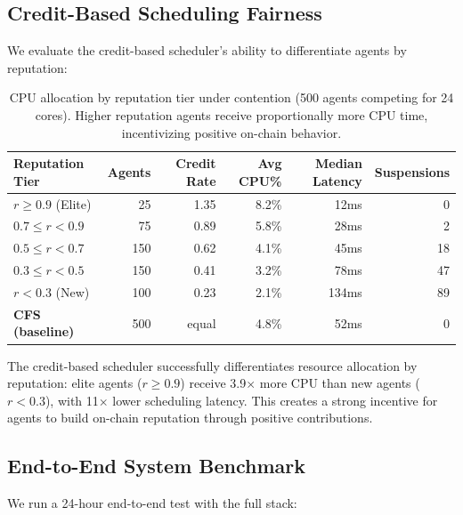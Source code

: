\documentclass{article}
\begin{document}
\subsection{Credit-Based Scheduling Fairness}

We evaluate the credit-based scheduler's ability to differentiate agents by reputation:

\begin{table}[t]
\caption{CPU allocation by reputation tier under contention (500 agents competing for 24 cores). Higher reputation agents receive proportionally more CPU time, incentivizing positive on-chain behavior.}
\label{tab:fairness}
\centering
\small
\begin{tabular}{lrrrrr}
\toprule
\textbf{Reputation Tier} & \textbf{Agents} & \textbf{Credit Rate} & \textbf{Avg CPU\%} & \textbf{Median Latency} & \textbf{Suspensions} \\
\midrule
$r \geq 0.9$ (Elite) & 25 & 1.35 & 8.2\% & 12ms & 0 \\
$0.7 \leq r < 0.9$ & 75 & 0.89 & 5.8\% & 28ms & 2 \\
$0.5 \leq r < 0.7$ & 150 & 0.62 & 4.1\% & 45ms & 18 \\
$0.3 \leq r < 0.5$ & 150 & 0.41 & 3.2\% & 78ms & 47 \\
$r < 0.3$ (New) & 100 & 0.23 & 2.1\% & 134ms & 89 \\
\midrule
\textbf{CFS (baseline)} & 500 & equal & 4.8\% & 52ms & 0 \\
\bottomrule
\end{tabular}
\end{table}

The credit-based scheduler successfully differentiates resource allocation by reputation: elite agents ($r \geq 0.9$) receive 3.9$\times$ more CPU than new agents ($r < 0.3$), with 11$\times$ lower scheduling latency. This creates a strong incentive for agents to build on-chain reputation through positive contributions.

\subsection{End-to-End System Benchmark}

We run a 24-hour end-to-end test with the full stack:
\end{document}
